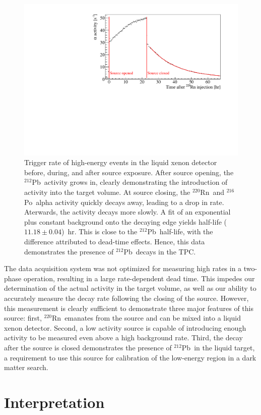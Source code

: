 \begin{figure}[htb]
\centering
    \includegraphics[trim = 0 0 0 0, clip = true,width = 0.8\columnwidth]{figures/rnsource/tpc_rate}
    \caption{Trigger rate of high-energy events in the liquid xenon detector before, during, and after source exposure. After source opening, the $^{212}$Pb~activity grows in, clearly demonstrating the introduction of activity into the target volume. At source closing, the $^{220}$Rn~and $^{216}$Po~alpha activity quickly decays away, leading to a drop in rate. Aterwards, the activity decays more slowly. A fit of an exponential plus constant background onto the decaying edge yields half-life ($11.18\pm0.04$)~hr. This is close to the $^{212}$Pb~half-life, with the difference attributed to dead-time effects. Hence, this data demonstrates the presence of $^{212}$Pb~decays in the TPC.}\label{fig:rn_rates}
\end{figure}

The data acquisition system was not optimized for measuring high rates in a two-phase operation, resulting in a large rate-dependent dead time. This impedes our determination of the actual activity in the target volume, as well as our ability to accurately measure the decay rate following the closing of the source. However, this measurement is clearly sufficient to demonstrate three major features of this source: first, $^{220}$Rn~emanates from the source and can be mixed into a liquid xenon detector. Second, a low activity source is capable of introducing enough activity to be measured even above a high background rate. Third, the decay after the source is closed demonstrates the presence of $^{212}$Pb~in the liquid target, a requirement to use this source for calibration of the low-energy region in a dark matter search.

\section{Interpretation}


